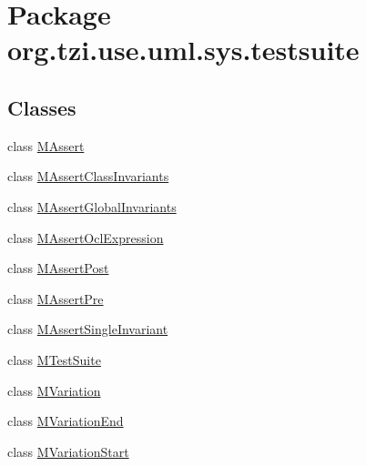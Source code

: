 \hypertarget{namespaceorg_1_1tzi_1_1use_1_1uml_1_1sys_1_1testsuite}{\section{Package org.\-tzi.\-use.\-uml.\-sys.\-testsuite}
\label{namespaceorg_1_1tzi_1_1use_1_1uml_1_1sys_1_1testsuite}
}
\subsection*{Classes}
\begin{DoxyCompactItemize}
\item 
class \hyperlink{classorg_1_1tzi_1_1use_1_1uml_1_1sys_1_1testsuite_1_1_m_assert}{M\-Assert}
\item 
class \hyperlink{classorg_1_1tzi_1_1use_1_1uml_1_1sys_1_1testsuite_1_1_m_assert_class_invariants}{M\-Assert\-Class\-Invariants}
\item 
class \hyperlink{classorg_1_1tzi_1_1use_1_1uml_1_1sys_1_1testsuite_1_1_m_assert_global_invariants}{M\-Assert\-Global\-Invariants}
\item 
class \hyperlink{classorg_1_1tzi_1_1use_1_1uml_1_1sys_1_1testsuite_1_1_m_assert_ocl_expression}{M\-Assert\-Ocl\-Expression}
\item 
class \hyperlink{classorg_1_1tzi_1_1use_1_1uml_1_1sys_1_1testsuite_1_1_m_assert_post}{M\-Assert\-Post}
\item 
class \hyperlink{classorg_1_1tzi_1_1use_1_1uml_1_1sys_1_1testsuite_1_1_m_assert_pre}{M\-Assert\-Pre}
\item 
class \hyperlink{classorg_1_1tzi_1_1use_1_1uml_1_1sys_1_1testsuite_1_1_m_assert_single_invariant}{M\-Assert\-Single\-Invariant}
\item 
class \hyperlink{classorg_1_1tzi_1_1use_1_1uml_1_1sys_1_1testsuite_1_1_m_test_suite}{M\-Test\-Suite}
\item 
class \hyperlink{classorg_1_1tzi_1_1use_1_1uml_1_1sys_1_1testsuite_1_1_m_variation}{M\-Variation}
\item 
class \hyperlink{classorg_1_1tzi_1_1use_1_1uml_1_1sys_1_1testsuite_1_1_m_variation_end}{M\-Variation\-End}
\item 
class \hyperlink{classorg_1_1tzi_1_1use_1_1uml_1_1sys_1_1testsuite_1_1_m_variation_start}{M\-Variation\-Start}
\end{DoxyCompactItemize}
